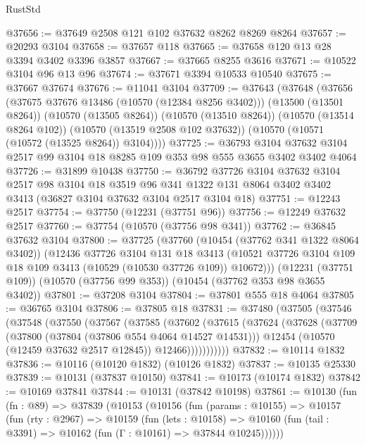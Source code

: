 \begin{lexlean}{RustStd}
\begin{coremodule}
@37656 := @37649 @2508 @121 @102 @37632 @8262 @8269 @8264
@37657 := @20293 @3104
@37658 := @37657 @118
@37665 := @37658 @120 @13 @28 @3394 @3402 @3396 @3857
@37667 := @37665 @8255 @3616
@37671 := @10522 @3104 @96 @13 @96
@37674 := @37671 @3394 @10533 @10540
@37675 := @37667 @37674
@37676 := @11041 @3104
@37709 := @37643
    (@37648
      (@37656
        (@37675 @37676 @13486 (@10570 (@12384 @8256 @3402)))
        (@13500 (@13501 @8264))
        (@10570 (@13505 @8264))
        (@10570 (@13510 @8264))
        (@10570 (@13514 @8264 @102))
        (@10570 (@13519 @2508 @102 @37632))
        (@10570 (@10571 (@10572 (@13525 @8264)) @3104))))
@37725 := @36793
    @3104
    @37632
    @3104
    @2517
    @99
    @3104
    @18
    @8285
    @109
    @353
    @98
    @555
    @3655
    @3402
    @3402
    @4064
@37726 := @31899 @10438
@37750 := @36792
    @37726
    @3104
    @37632
    @3104
    @2517
    @98
    @3104
    @18
    @3519
    @96
    @341
    @1322
    @131
    @8064
    @3402
    @3402
    @3413
    (@36827 @3104 @37632 @3104 @2517 @3104 @18)
@37751 := @12243 @2517
@37754 := @37750 (@12231 (@37751 @96))
@37756 := @12249 @37632 @2517
@37760 := @37754 (@10570 (@37756 @98 @341))
@37762 := @36845 @37632 @3104
@37800 := @37725
    (@37760
      (@10454 (@37762 @341 @1322 @8064 @3402))
      (@12436
        @37726
        @3104
        @131
        @18
        @3413
        (@10521 @37726 @3104 @109 @18 @109 @3413 (@10529 (@10530 @37726 @109)) @10672)))
    (@12231 (@37751 @109))
    (@10570 (@37756 @99 @353))
    (@10454 (@37762 @353 @98 @3655 @3402))
@37801 := @37208 @3104
@37804 := @37801 @555 @18 @4064
@37805 := @36765 @3104
@37806 := @37805 @18
@37831 := @37480
    (@37505
      (@37546
        (@37548
          (@37550
            (@37567
              (@37585
                (@37602
                  (@37615
                    (@37624
                      (@37628
                        (@37709
                          (@37800 (@37804 (@37806 @554 @4064 @14527 @14531)))
                          @12454
                          (@10570 (@12459 @37632 @2517 @12845))
                          @12466)))))))))))
@37832 := @10114 @1832
@37836 := @10116 (@10120 @1832) (@10126 @1832)
@37837 := @10135 @25330
@37839 := @10131 (@37837 @10150)
@37841 := @10173 (@10174 @1832)
@37842 := @10169 @37841
@37844 := @10131 (@37842 @10198)
@37861 := @10130
    (fun (fn : @89) =>
    @37839
      (@10153
        (@10156
          (fun (params : @10155) =>
          @10157
            (fun (rty : @2967) =>
            @10159
              (fun (lets : @10158) =>
              @10160 (fun (tail : @3391) => @10162 (fun (Γ : @10161) => @37844 @10245))))))

\end{coremodule}
\end{lexlean}
